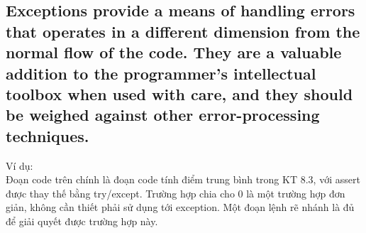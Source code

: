 \documentclass{article}
\begin{document}
    \subsection{Exceptions provide a means of handling errors that operates in a different dimension from the normal flow of the code. They are a valuable addition to the programmer's intellectual toolbox when used with care, and they should be weighed against other error-processing techniques.}
    
    Ví dụ:\\
    Đoạn code trên chính là đoạn code tính điểm trung bình trong KT 8.3, với assert được thay thế bằng try/except. Trường hợp chia cho 0 là một trường hợp đơn giản, không cần thiết phải sử dụng tới exception. Một đoạn lệnh rẽ nhánh là đủ để giải quyết được trường hợp này.
    
\end{document}
